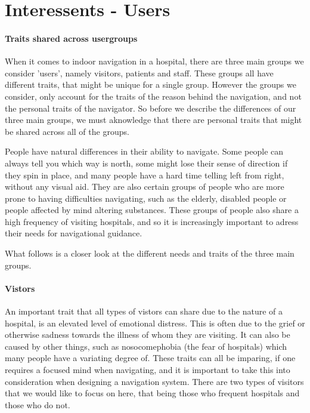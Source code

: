\section{Interessents - Users} %
\label{sec:interusers}


\paragraph{Traits shared across usergroups}

When it comes to indoor navigation in a hospital, there are three main groups we consider 'users', namely visitors, patients and staff. These groups all have different traits, that might be unique for a single group. However the groups we consider, only account for the traits of the reason behind the navigation, and not the personal traits of the navigator. So before we describe the differences of our three main groups, we must aknowledge that there are personal traits that might be shared across all of the groups.

People have natural differences in their ability to navigate. Some people can always tell you which way is north, some might lose their sense of direction if they spin in place, and many people have a hard time telling left from right, without any visual aid. They are also certain groups of people who are more prone to having difficulties navigating, such as the elderly, disabled people or people affected by mind altering substances. These groups of people also share a high frequency of visiting hospitals, and so it is increasingly important to adress their needs for navigational guidance.

What follows is a closer look at the different needs and traits of the three main groups.

\paragraph{Vistors} %
 \label{par:vistors}
 

An important trait that all types of vistors can share due to the nature of a hospital, is an elevated level of emotional distress. This is often due to the grief or otherwise sadness towards the illness of whom they are visiting. It can also be caused by other things, such as nosocomephobia (the fear of hospitals) which many people have a variating degree of. These traits can all be imparing, if one requires a focused mind when navigating, and it is important to take this into consideration when designing a navigation system. There are two types of visitors that we would like to focus on here, that being those who frequent hospitals and those who do not.

